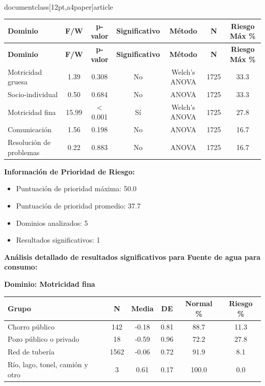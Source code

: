 \\documentclass[12pt,a4paper]{article}
\begin{document}
\begin{longtable}{|l|c|c|c|c|c|c|}
\hline
\textbf{Dominio} & \textbf{F/W} & \textbf{p-valor} & \textbf{Significativo} & \textbf{Método} & \textbf{N} & \textbf{Riesgo Máx \%} \\
\hline
\endfirsthead

\hline
\textbf{Dominio} & \textbf{F/W} & \textbf{p-valor} & \textbf{Significativo} & \textbf{Método} & \textbf{N} & \textbf{Riesgo Máx \%} \\
\hline
\endhead

\hline
\endfoot

\hline
\endlastfoot

Motricidad gruesa & 1.39 & 0.308 & No & Welch's ANOVA & 1725 & 33.3 \\
Socio-individual & 0.50 & 0.684 & No & ANOVA & 1725 & 33.3 \\
Motricidad fina & 15.99 & < 0.001 & Sí & Welch's ANOVA & 1725 & 27.8 \\
Comunicación & 1.56 & 0.198 & No & ANOVA & 1725 & 16.7 \\
Resolución de problemas & 0.22 & 0.883 & No & ANOVA & 1725 & 16.7 \\

\end{longtable}


\textbf{Información de Prioridad de Riesgo:}
\begin{itemize}
\item Puntuación de prioridad máxima: 50.0
\item Puntuación de prioridad promedio: 37.7
\item Dominios analizados: 5
\item Resultados significativos: 1
\end{itemize}


\textbf{Análisis detallado de resultados significativos para Fuente de agua para consumo:}


\textbf{Dominio: Motricidad fina}


\begin{center}
\begin{tabular}{|l|c|c|c|c|c|}
\hline
\textbf{Grupo} & \textbf{N} & \textbf{Media} & \textbf{DE} & \textbf{Normal \%} & \textbf{Riesgo \%} \\
\hline
Chorro público & 142 & -0.18 & 0.81 & 88.7 & 11.3 \\
Pozo público o privado & 18 & -0.59 & 0.96 & 72.2 & 27.8 \\
Red de tubería & 1562 & -0.06 & 0.72 & 91.9 & 8.1 \\
Río, lago, tonel, camión y otro & 3 & 0.61 & 0.17 & 100.0 & 0.0 \\

\hline
\end{tabular}
\end{center}
\end{document}

